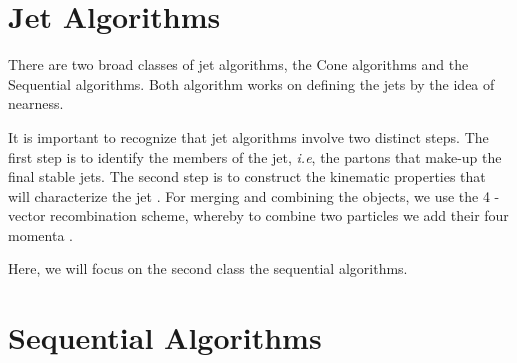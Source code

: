 \section{Jet Algorithms}

There are two broad classes of jet algorithms, the Cone algorithms and the Sequential algorithms. Both algorithm works on defining the jets by the idea of nearness.

It is important to recognize that jet algorithms involve two distinct steps. The first step is to identify the members of the jet, \textit{i.e}, the partons that make-up the final stable jets. The second step is to construct the kinematic properties that will characterize the jet \citep{Berger:2002jt}. For merging and combining the objects, we use the 4 -vector recombination scheme, whereby to combine two particles we add their four momenta \citep{Blazey:2000qt}. 

Here, we will focus on the second class the sequential algorithms.  

%
%
\section{Sequential Algorithms}


